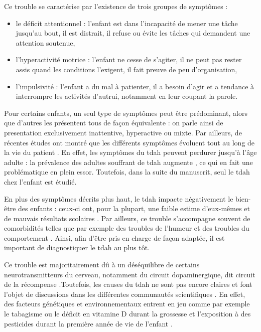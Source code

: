Ce trouble se caractérise par l'existence de trois groupes de symptômes \citep{HAS} : 
\begin{itemize}
\item le déficit attentionnel : l'enfant est dans l'incapacité de mener une tâche jusqu'au bout, il est distrait, il refuse ou évite les tâches qui demandent
une attention soutenue,
\item l'hyperactivité motrice : l'enfant ne cesse de s'agiter, il ne peut pas rester assis quand les conditions l'exigent, il fait preuve de peu d'organisation,
\item l'impulsivité : l'enfant a du mal à patienter, il a besoin d'agir et a tendance à interrompre les activités d'autrui, notamment en leur coupant la parole.
\end{itemize}
Pour certains enfants, un seul type de symptômes peut être prédominant, alors que d'autres les présentent tous de façon équivalente \citep{DSM-5} : 
on parle ainsi de presentation exclusivement inattentive, hyperactive ou mixte. Par ailleurs, de récentes 
études ont montré que les différents symptômes évoluent tout au long de la vie du patient \citep{CFDCAP, Epstein2013}. En effet, les symptômes du \gls{tdah}
peuvent perdurer jusqu'à l'âge adulte \citep{Faraone2006} : la prévalence des adultes souffrant de \gls{tdah} augmente \citep{Chung2019, Weibel2019}, ce qui en fait une problématique
en plein essor. Toutefois, dans la suite du manuscrit, seul le \gls{tdah} chez l'enfant est étudié. 

En plus des symptômes décrits plus haut, le \gls{tdah} impacte négativement le bien-être des enfants : ceux-ci ont, pour la plupart, une faible estime d'eux-mêmes 
\citep{Shaw2005} et de mauvais résultats scolaires \citep{Barry2002}. Par ailleurs, ce trouble s'accompagne souvent de comorbidités telles que par exemple 
des troubles de l'humeur et des troubles du comportement \citep{Monastra2005}. Ainsi, afin d'être pris en charge de façon adaptée, il est important de diagnostiquer 
le \gls{tdah} au plus tôt. 

Ce trouble est majoritairement dû à un déséquilibre de certains neurotransmitteurs du cerveau, notamment du circuit dopaminergique, 
dit circuit de la récompense \citep{Daley2010, Punja2016}.Toutefois, les causes du \gls{tdah} ne sont pas encore claires et font l'objet de discussions
dans les différentes communautés scientifiques \citep{Galera2014}. En effet, des facteurs génétiques et environnementaux entrent en jeu comme par exemple le tabagisme ou le déficit en
vitamine D durant la grossesse et l'exposition à des pesticides durant la première année de vie de l'enfant \citep{Galera2014, Sucksdorff2019}.

